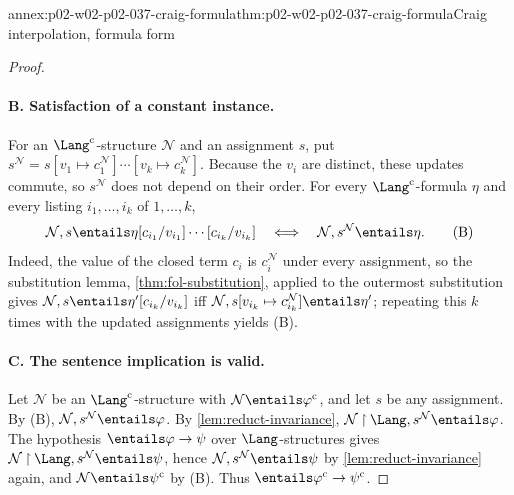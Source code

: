 \begin{annexitem}{annex:p02-w02-p02-037-craig-formula}{thm:p02-w02-p02-037-craig-formula}{Craig interpolation, formula form}
\begin{proof}
\paragraph{B. Satisfaction of a constant instance.}
For an \(\Lang^{\mathrm{c}}\)-structure \(\mathcal N\) and an assignment \(s\), put
\(s^{\mathcal N}=s[v_1\mapsto c_1^{\mathcal N}]\cdots
[v_k\mapsto c_k^{\mathcal N}]\).  Because the \(v_i\) are distinct, these
updates commute, so \(s^{\mathcal N}\) does not depend on their order.  For
every \(\Lang^{\mathrm{c}}\)-formula \(\eta\) and every listing
\(i_1,\ldots,i_k\) of \(1,\ldots,k\),
\[
 \mathcal N,s\entails\eta[c_{i_1}/v_{i_1}]\cdots[c_{i_k}/v_{i_k}]
 \quad\Longleftrightarrow\quad
 \mathcal N,s^{\mathcal N}\entails\eta .
 \tag{B}
\]
Indeed, the value of the closed term \(c_i\) is \(c_i^{\mathcal N}\) under
every assignment, so the substitution lemma, \cref{thm:fol-substitution},
applied to the outermost substitution gives
\(\mathcal N,s\entails\eta'[c_{i_k}/v_{i_k}]\) iff
\(\mathcal N,s[v_{i_k}\mapsto c_{i_k}^{\mathcal N}]\entails\eta'\); repeating
this \(k\) times with the updated assignments yields (B).

\paragraph{C. The sentence implication is valid.}
Let \(\mathcal N\) be an \(\Lang^{\mathrm{c}}\)-structure with
\(\mathcal N\entails\varphi^{\mathrm{c}}\), and let \(s\) be any assignment.  By (B),
\(\mathcal N,s^{\mathcal N}\entails\varphi\).  By
\cref{lem:reduct-invariance},
\(\mathcal N\mathbin{\upharpoonright}\Lang,s^{\mathcal N}\entails\varphi\).  The hypothesis
\(\entails\varphi\to\psi\) over \(\Lang\)-structures gives
\(\mathcal N\mathbin{\upharpoonright}\Lang,s^{\mathcal N}\entails\psi\), hence
\(\mathcal N,s^{\mathcal N}\entails\psi\) by
\cref{lem:reduct-invariance} again, and
\(\mathcal N\entails\psi^{\mathrm{c}}\) by (B).  Thus
\(\entails\varphi^{\mathrm{c}}\to\psi^{\mathrm{c}}\).


\end{proof}
\end{annexitem}
